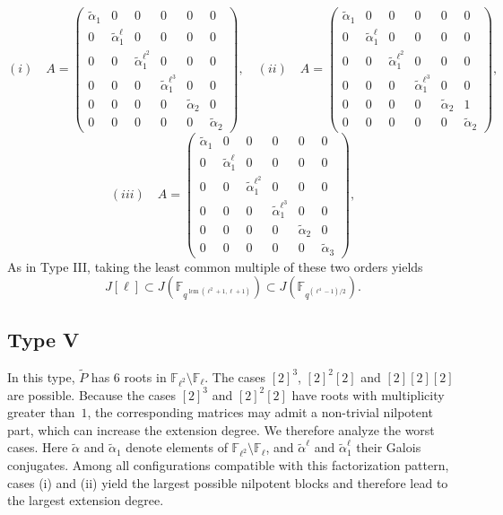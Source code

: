\documentclass[11pt,a4paper]{article}
\theoremstyle{plain}
\theoremstyle{definition}
\theoremstyle{remark}
\DeclareMathOperator{\lcm}{lcm}
\begin{document}
\[
(i)\quad A =
\begin{pmatrix}
\tilde{\alpha}_1 & 0 & 0 & 0 & 0 & 0\\
0 & \tilde{\alpha}_1^\ell & 0 & 0 & 0 & 0\\
0 & 0 & \tilde{\alpha}_1^{\ell^2} & 0 & 0 & 0\\
0 & 0 & 0 & \tilde{\alpha}_1^{\ell^3} & 0 & 0\\
0 & 0 & 0 & 0 & \tilde{\alpha}_2 & 0\\
0 & 0 & 0 & 0 & 0 & \tilde{\alpha}_2
\end{pmatrix},\quad (ii)\quad A =
\begin{pmatrix}
\tilde{\alpha}_1 & 0 & 0 & 0 & 0 & 0\\
0 & \tilde{\alpha}_1^\ell & 0 & 0 & 0 & 0\\
0 & 0 & \tilde{\alpha}_1^{\ell^2} & 0 & 0 & 0\\
0 & 0 & 0 & \tilde{\alpha}_1^{\ell^3} & 0 & 0\\
0 & 0 & 0 & 0 & \tilde{\alpha}_2 & 1\\
0 & 0 & 0 & 0 & 0 & \tilde{\alpha}_2
\end{pmatrix},
\]
\[
(iii) \quad A =
\begin{pmatrix}
\tilde{\alpha}_1 & 0 & 0 & 0 & 0 & 0\\
0 & \tilde{\alpha}_1^\ell & 0 & 0 & 0 & 0\\
0 & 0 & \tilde{\alpha}_1^{\ell^2} & 0 & 0 & 0\\
0 & 0 & 0 & \tilde{\alpha}_1^{\ell^3} & 0 & 0\\
0 & 0 & 0 & 0 & \tilde{\alpha}_2 & 0\\
0 & 0 & 0 & 0 & 0 & \tilde{\alpha}_3
\end{pmatrix},
\]
As in Type III, taking the least common multiple of these two orders yields
\[
J[\ell] \subset J(\mathbb{F}_{q^{\lcm(\ell^2+1,\ell+1)}}) \subset J(\mathbb{F}_{q^{(\ell^4-1)/2}}) .
\]



\subsection*{Type V}
In this type, $\tilde{P}$  has $6$ roots in
$\mathbb{F}_{\ell^2} \setminus \mathbb{F}_\ell$.
The cases  $[2]^3$,  $[2]^2[2]$  and  $[2][2][2]$  are possible.
Because the cases  $[2]^3$ and  $[2]^2[2]$  have roots with multiplicity greater than~$1$,
the corresponding matrices may admit a non-trivial nilpotent part,
which can increase the extension degree.
We therefore analyze the worst cases.
Here $\tilde{\alpha}$  and  $\tilde{\alpha}_1$ denote elements of
$\mathbb{F}_{\ell^2}\setminus\mathbb{F}_\ell$,
and $\tilde{\alpha}^\ell$ and $\tilde{\alpha}_1^\ell$ their Galois conjugates. Among all configurations compatible with this factorization pattern,
cases (i) and (ii) yield the largest possible nilpotent blocks and therefore
lead to the largest extension degree.
\end{document}
